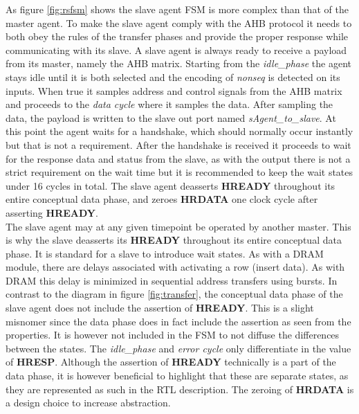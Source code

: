 As figure \ref{fig:rsfsm} shows the slave agent FSM is more complex than that of the master agent. To make the slave agent comply with the AHB protocol it needs to both obey the rules of the transfer phases and provide the proper response while communicating with its slave. A slave agent is always ready to receive a payload from its master, namely the AHB matrix. 
Starting from the \textit{idle\_phase} the agent stays idle until it is both selected and the encoding of \textit{nonseq} is detected on its inputs. When true it samples address and control signals from the AHB matrix and proceeds to the \textit{data cycle} where it samples the data. After sampling the data, the payload is written to the slave out port named \textit{sAgent\_to\_slave}. At this point the agent waits for a handshake, which should normally occur instantly but that is not a requirement. After the handshake is received it proceeds to wait for the response data and status from the slave, as with the output there is not a strict requirement on the wait time but it is recommended to keep the wait states under 16 cycles in total. The slave agent deasserts \textbf{HREADY} throughout its entire conceptual data phase, and zeroes \textbf{HRDATA} one clock cycle after asserting \textbf{HREADY}. \\
\newline
{}
The slave agent may at any given timepoint be operated by another master. This is why the slave deasserts its \textbf{HREADY} throughout its entire conceptual data phase. It is standard for a slave to introduce wait states. As with a DRAM module, there are delays associated with activating a row (insert data). As with DRAM this delay is minimized in sequential address transfers using bursts. In contrast to the diagram in figure \ref{fig:transfer}, the conceptual data phase of the slave agent does not include the assertion of \textbf{HREADY}. 
This is a slight misnomer since the data phase does in fact include the assertion as seen from the properties. It is however not included in the FSM to not diffuse the differences between the states. The \textit{idle\_phase} and \textit{error cycle} only differentiate in the value of \textbf{HRESP}. Although the assertion of \textbf{HREADY} technically is a part of the data phase, it is however beneficial to highlight that these are separate states, as they are represented as such in the RTL description. The zeroing of \textbf{HRDATA} is a design choice to increase abstraction. 
\newpage

